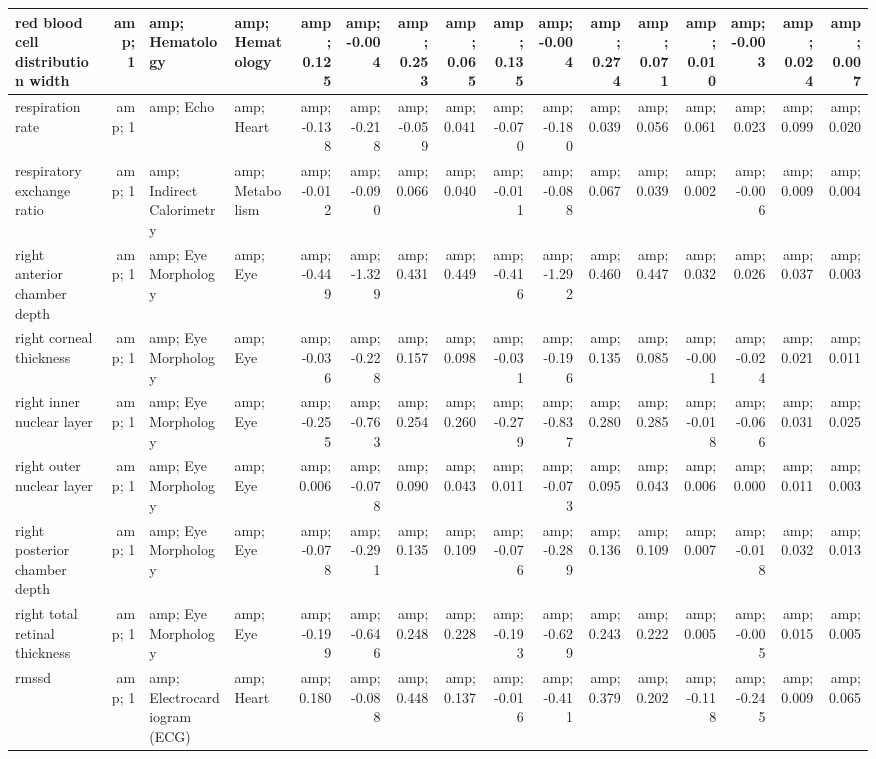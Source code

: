 \documentclass[]{article}
\begin{document}
\begin{table}
\begin{tabular}[t]{l|r|l|l|r|r|r|r|r|r|r|r|r|r|r|r}
\hline
red blood cell distribution width &amp; 1 &amp; Hematology &amp; Hematology &amp; 0.125 &amp; -0.004 &amp; 0.253 &amp; 0.065 &amp; 0.135 &amp; -0.004 &amp; 0.274 &amp; 0.071 &amp; 0.010 &amp; -0.003 &amp; 0.024 &amp; 0.007\\
\hline
respiration rate &amp; 1 &amp; Echo &amp; Heart &amp; -0.138 &amp; -0.218 &amp; -0.059 &amp; 0.041 &amp; -0.070 &amp; -0.180 &amp; 0.039 &amp; 0.056 &amp; 0.061 &amp; 0.023 &amp; 0.099 &amp; 0.020\\
\hline
respiratory exchange ratio &amp; 1 &amp; Indirect Calorimetry &amp; Metabolism &amp; -0.012 &amp; -0.090 &amp; 0.066 &amp; 0.040 &amp; -0.011 &amp; -0.088 &amp; 0.067 &amp; 0.039 &amp; 0.002 &amp; -0.006 &amp; 0.009 &amp; 0.004\\
\hline
right anterior chamber depth &amp; 1 &amp; Eye Morphology &amp; Eye &amp; -0.449 &amp; -1.329 &amp; 0.431 &amp; 0.449 &amp; -0.416 &amp; -1.292 &amp; 0.460 &amp; 0.447 &amp; 0.032 &amp; 0.026 &amp; 0.037 &amp; 0.003\\
\hline
right corneal thickness &amp; 1 &amp; Eye Morphology &amp; Eye &amp; -0.036 &amp; -0.228 &amp; 0.157 &amp; 0.098 &amp; -0.031 &amp; -0.196 &amp; 0.135 &amp; 0.085 &amp; -0.001 &amp; -0.024 &amp; 0.021 &amp; 0.011\\
\hline
right inner nuclear layer &amp; 1 &amp; Eye Morphology &amp; Eye &amp; -0.255 &amp; -0.763 &amp; 0.254 &amp; 0.260 &amp; -0.279 &amp; -0.837 &amp; 0.280 &amp; 0.285 &amp; -0.018 &amp; -0.066 &amp; 0.031 &amp; 0.025\\
\hline
right outer nuclear layer &amp; 1 &amp; Eye Morphology &amp; Eye &amp; 0.006 &amp; -0.078 &amp; 0.090 &amp; 0.043 &amp; 0.011 &amp; -0.073 &amp; 0.095 &amp; 0.043 &amp; 0.006 &amp; 0.000 &amp; 0.011 &amp; 0.003\\
\hline
right posterior chamber depth &amp; 1 &amp; Eye Morphology &amp; Eye &amp; -0.078 &amp; -0.291 &amp; 0.135 &amp; 0.109 &amp; -0.076 &amp; -0.289 &amp; 0.136 &amp; 0.109 &amp; 0.007 &amp; -0.018 &amp; 0.032 &amp; 0.013\\
\hline
right total retinal thickness &amp; 1 &amp; Eye Morphology &amp; Eye &amp; -0.199 &amp; -0.646 &amp; 0.248 &amp; 0.228 &amp; -0.193 &amp; -0.629 &amp; 0.243 &amp; 0.222 &amp; 0.005 &amp; -0.005 &amp; 0.015 &amp; 0.005\\
\hline
rmssd &amp; 1 &amp; Electrocardiogram (ECG) &amp; Heart &amp; 0.180 &amp; -0.088 &amp; 0.448 &amp; 0.137 &amp; -0.016 &amp; -0.411 &amp; 0.379 &amp; 0.202 &amp; -0.118 &amp; -0.245 &amp; 0.009 &amp; 0.065\\

\end{tabular}
\end{table}
\end{document}
